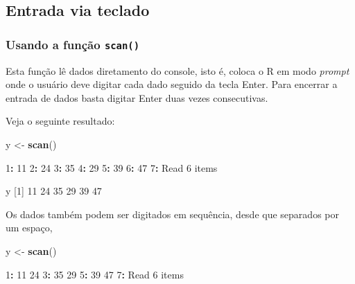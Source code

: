 \documentclass[10pt,a4paper]{book}
\newenvironment{Shaded}{\begin{snugshade}}{\end{snugshade}}
\newcommand{\KeywordTok}[1]{\textcolor[rgb]{0.13,0.29,0.53}{\textbf{#1}}}
\newcommand{\DecValTok}[1]{\textcolor[rgb]{0.00,0.00,0.81}{#1}}
\newcommand{\StringTok}[1]{\textcolor[rgb]{0.31,0.60,0.02}{#1}}
\newcommand{\OperatorTok}[1]{\textcolor[rgb]{0.81,0.36,0.00}{\textbf{#1}}}
\newcommand{\NormalTok}[1]{#1}
\begin{document}
\subsection{Entrada via teclado}\label{entrada-via-teclado}

\subsubsection{\texorpdfstring{Usando a função
\texttt{scan()}}{Usando a função scan()}}\label{usando-a-funcao-scan}

Esta função lê dados diretamento do console, isto é, coloca o R em modo
\emph{prompt} onde o usuário deve digitar cada dado seguido da tecla
Enter. Para encerrar a entrada de dados basta digitar Enter duas vezes
consecutivas.

Veja o seguinte resultado:

\begin{Shaded}
\begin{Highlighting}[]
\NormalTok{y <-}\StringTok{ }\KeywordTok{scan}\NormalTok{()}

\DecValTok{1}\OperatorTok{:}\StringTok{ }\DecValTok{11}
\DecValTok{2}\OperatorTok{:}\StringTok{ }\DecValTok{24}
\DecValTok{3}\OperatorTok{:}\StringTok{ }\DecValTok{35}
\DecValTok{4}\OperatorTok{:}\StringTok{ }\DecValTok{29}
\DecValTok{5}\OperatorTok{:}\StringTok{ }\DecValTok{39}
\DecValTok{6}\OperatorTok{:}\StringTok{ }\DecValTok{47}
\DecValTok{7}\OperatorTok{:}
\NormalTok{Read }\DecValTok{6}\NormalTok{ items}
\end{Highlighting}
\end{Shaded}

\begin{Shaded}
\begin{Highlighting}[]
\NormalTok{y}
\NormalTok{[}\DecValTok{1}\NormalTok{] }\DecValTok{11} \DecValTok{24} \DecValTok{35} \DecValTok{29} \DecValTok{39} \DecValTok{47}
\end{Highlighting}
\end{Shaded}

Os dados também podem ser digitados em sequência, desde que separados
por um espaço,

\begin{Shaded}
\begin{Highlighting}[]
\NormalTok{y <-}\StringTok{ }\KeywordTok{scan}\NormalTok{()}

\DecValTok{1}\OperatorTok{:}\StringTok{ }\DecValTok{11} \DecValTok{24}
\DecValTok{3}\OperatorTok{:}\StringTok{ }\DecValTok{35} \DecValTok{29}
\DecValTok{5}\OperatorTok{:}\StringTok{ }\DecValTok{39} \DecValTok{47}
\DecValTok{7}\OperatorTok{:}
\NormalTok{Read }\DecValTok{6}\NormalTok{ items}
\end{Highlighting}
\end{Shaded}
\end{document}
